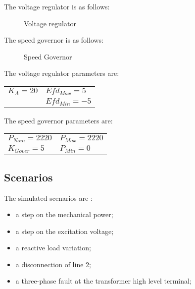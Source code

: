 \documentclass[a4paper, 12pt]{report}
\begin{document}
The voltage regulator is as follows:
\begin{figure}[H]
\centering
{}
\caption{Voltage regulator}
\end{figure}

The speed governor is as follows:
\begin{figure}[H]
\centering
{}
\caption{Speed Governor}
\end{figure}

The voltage regulator parameters are:
\begin{center}
\begin{tabular}{l|l}
   $K_A=20$ & $Efd_{Max}=5$  \\
    & $Efd_{Min}=-5$   \\
\end{tabular}
\end{center}

The speed governor parameters are:
\begin{center}
\begin{tabular}{l|l}
   $P_{Nom}=2220$ & $P_{Max}=2220$  \\
   $K_{Gover}=5$ & $P_{Min}=0$   \\
\end{tabular}
\end{center}

\subsection{Scenarios}
The simulated scenarios are :
\begin{itemize}
\item a step on the mechanical power;
\item a step on the excitation voltage;
\item a reactive load variation;
\item a disconnection of line 2;
\item a three-phase fault at the transformer high level terminal;
\end{itemize}
\end{document}
